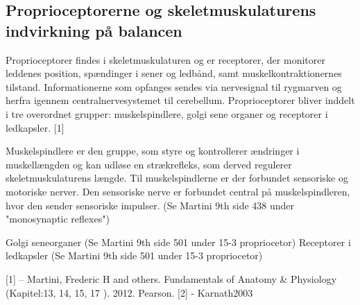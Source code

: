 
\subsection{Proprioceptorerne og skeletmuskulaturens indvirkning på balancen}
Proprioceptorer findes i skeletmuskulaturen og er receptorer, der monitorer leddenes position, spændinger i sener og ledbånd, samt muskelkontraktionernes tilstand. Informationerne som opfanges sendes via nervesignal til rygmarven og herfra igennem centralnervesystemet til cerebellum. Proprioceptorer bliver inddelt i tre overordnet grupper: muskelspindlere, golgi sene organer og receptorer i ledkapsler. [1]

Muskelspindlere er den gruppe, som styre og kontrollerer ændringer i muskellængden og kan udløse en strækrefleks, som derved regulerer skeletmuskulaturens længde. Til muskelspindlerne er der forbundet sensoriske og motoriske nerver. Den sensoriske nerve er forbundet central på muskelspindleren, hvor den sender sensoriske impulser.  (Se Martini 9th side 438 under "monosynaptic reflexes")  

Golgi seneorganer (Se Martini 9th side 501 under 15-3 propriocetor)
Receptorer i ledkapsler (Se Martini 9th side 501 under 15-3 propriocetor)




[1] – Martini, Frederic H and others. Fundamentals of Anatomy & Physiology (Kapitel:13, 14, 15, 17 ). 2012. Pearson. 
[2] - Karnath2003

